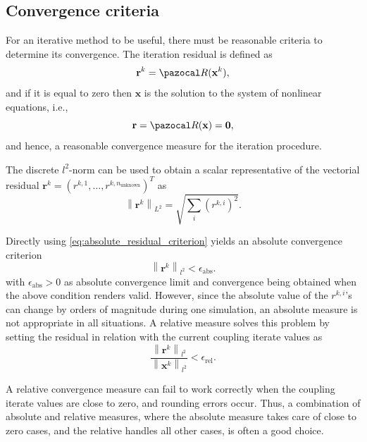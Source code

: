 \subsection{Convergence criteria}

For an iterative method to be useful, there must be reasonable criteria to determine its convergence.
The iteration residual is defined as
\begin{equation}
\mathbf r^{k} = \pazocal R(\mathbf x^{k}),
\end{equation}
and if it is equal to zero then $\mathbf x$ is the solution to the system of nonlinear equations, i.e.,
\begin{equation} \label{eq:residual_definition}
\mathbf r = \pazocal R(\mathbf x) = \mathbf 0,
\end{equation}
and hence, a reasonable convergence measure for the iteration procedure.

The discrete  $l^{2}$-norm can be used to obtain a scalar representative of the vectorial residual \(\mathbf r^{k}=\left(r^{k,1}, \ldots, r^{k,n_\text{unknown}}\right)^{T}\) as
\begin{equation} \label{eq:absolute_residual_criterion}
\left\|\mathbf{r}^{k}\right\|_{L^{2}}=\sqrt{\sum_{i}\left(r^{k, i}\right)^{2}}.
\end{equation}

Directly using \eqref{eq:absolute_residual_criterion} yields an absolute convergence criterion
\begin{equation}
\left\|\boldsymbol{r} ^{k}\right\|_{l^{2}}<\epsilon_\mathrm{abs}.
\end{equation}
with $\epsilon_\mathrm{abs}>0$ as absolute convergence limit and convergence being obtained when the above condition renders valid.
However, since the absolute value of the $r^{k, i} $'s can change by orders of magnitude during one simulation, an absolute measure is not appropriate in all situations.
A relative measure solves this problem by setting the residual in relation with the current coupling iterate values as
\begin{equation}
\frac{\left\|\mathbf{r}^{k}\right\|_{l^{2}}}{\left\|\mathbf{x}^{k}\right\|_{l^{2}}}<\epsilon_\mathrm{rel}.
\end{equation}

A relative convergence measure can fail to work correctly when the coupling iterate values are close to zero, and rounding errors occur.
Thus, a combination of absolute and relative measures, where the absolute measure takes care of close to zero cases, and the relative handles all other cases, is often a good choice.



